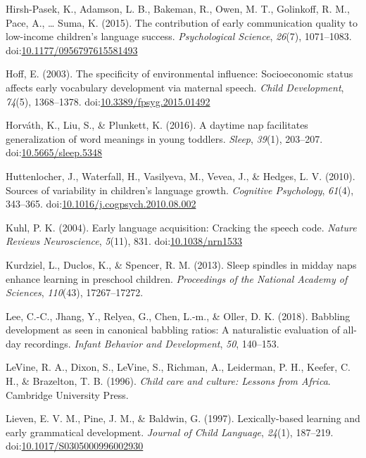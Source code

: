\documentclass[,man,floatsintext]{apa6}
\begin{document}
\hypertarget{ref-hirshpasek2015contribution}{}
Hirsh-Pasek, K., Adamson, L. B., Bakeman, R., Owen, M. T., Golinkoff, R.
M., Pace, A., \ldots{} Suma, K. (2015). The contribution of early
communication quality to low-income children's language success.
\emph{Psychological Science}, \emph{26}(7), 1071--1083.
doi:\href{https://doi.org/10.1177/0956797615581493}{10.1177/0956797615581493}

\hypertarget{ref-hoff2003specificity}{}
Hoff, E. (2003). The specificity of environmental influence:
Socioeconomic status affects early vocabulary development via maternal
speech. \emph{Child Development}, \emph{74}(5), 1368--1378.
doi:\href{https://doi.org/10.3389/fpsyg.2015.01492}{10.3389/fpsyg.2015.01492}

\hypertarget{ref-horvath2016daytime}{}
Horváth, K., Liu, S., \& Plunkett, K. (2016). A daytime nap facilitates
generalization of word meanings in young toddlers. \emph{Sleep},
\emph{39}(1), 203--207.
doi:\href{https://doi.org/10.5665/sleep.5348}{10.5665/sleep.5348}

\hypertarget{ref-huttenlocher2010sources}{}
Huttenlocher, J., Waterfall, H., Vasilyeva, M., Vevea, J., \& Hedges, L.
V. (2010). Sources of variability in children's language growth.
\emph{Cognitive Psychology}, \emph{61}(4), 343--365.
doi:\href{https://doi.org/10.1016/j.cogpsych.2010.08.002}{10.1016/j.cogpsych.2010.08.002}

\hypertarget{ref-kuhl2004early}{}
Kuhl, P. K. (2004). Early language acquisition: Cracking the speech
code. \emph{Nature Reviews Neuroscience}, \emph{5}(11), 831.
doi:\href{https://doi.org/10.1038/nrn1533}{10.1038/nrn1533}

\hypertarget{ref-kurdziel2013sleep}{}
Kurdziel, L., Duclos, K., \& Spencer, R. M. (2013). Sleep spindles in
midday naps enhance learning in preschool children. \emph{Proceedings of
the National Academy of Sciences}, \emph{110}(43), 17267--17272.

\hypertarget{ref-lee2018babbling}{}
Lee, C.-C., Jhang, Y., Relyea, G., Chen, L.-m., \& Oller, D. K. (2018).
Babbling development as seen in canonical babbling ratios: A
naturalistic evaluation of all-day recordings. \emph{Infant Behavior and
Development}, \emph{50}, 140--153.

\hypertarget{ref-levine1996child}{}
LeVine, R. A., Dixon, S., LeVine, S., Richman, A., Leiderman, P. H.,
Keefer, C. H., \& Brazelton, T. B. (1996). \emph{Child care and culture:
Lessons from Africa}. Cambridge University Press.

\hypertarget{ref-lieven1997lexically}{}
Lieven, E. V. M., Pine, J. M., \& Baldwin, G. (1997). Lexically-based
learning and early grammatical development. \emph{Journal of Child
Language}, \emph{24}(1), 187--219.
doi:\href{https://doi.org/10.1017/S0305000996002930}{10.1017/S0305000996002930}
\end{document}
